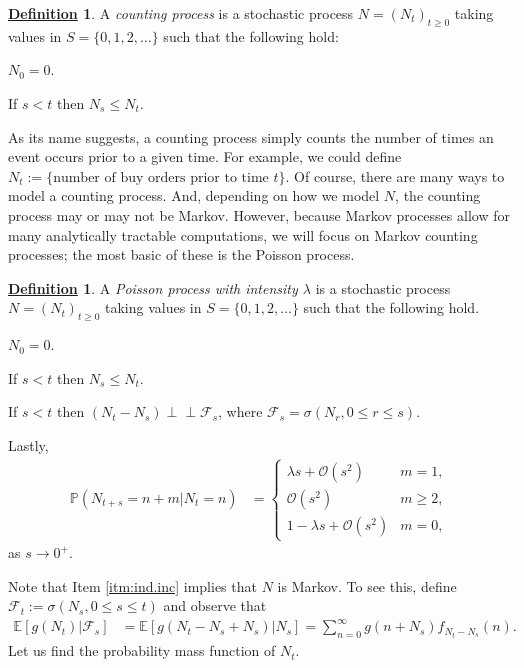 \documentclass[12pt]{book}
\numberwithin{equation}{chapter}
\theoremstyle{plain}
\numberwithin{theorem}{section}
\theoremstyle{definition}
\newtheorem{definition}[theorem]{\underline{Definition}}
\numberwithin{exercise}{chapter}
\newcommand{\<}{\langle}
\renewcommand{\>}{\rangle}
\renewcommand{\(}{\left(}
\renewcommand{\)}{\right)}
\renewcommand{\[}{\left[}
\renewcommand{\]}{\right]}
\newcommand\Eb{\mathds{E}}
\newcommand\Pb{\mathds{P}}
\newcommand\Fc{\mathscr{F}}
\newcommand\Oc{\mathscr{O}}
\newcommand\sig{\sigma}
\newcommand\lam{\lambda}
\newcommand{\ind}{\perp \! \! \! \perp}
\begin{document}
\begin{definition}
A \emph{counting process} is a stochastic process $N = (N_t)_{t \geq 0}$ taking values in $S = \{ 0, 1, 2, \ldots \}$ such that the following hold:
\begin{enumerate*}
\item $N_0 = 0$.
\item If $s<t$ then $N_s \leq N_t$.
\end{enumerate*}
\end{definition}

\noindent
As its name suggests, a counting process simply counts the number of times an event occurs prior to a given time.  For example, we could define $N_t := \{ \text{number of buy orders prior to time $t$} \}$.  Of course, there are many ways to model a counting process.  And, depending on how we model $N$, the counting process may or may not be Markov.  However, because Markov processes allow for many analytically tractable computations, we will focus on Markov counting processes; the most basic of these is the Poisson process.

\begin{definition}
\label{def:poisson.process}
A \emph{Poisson process with intensity $\lam$} is a stochastic process $N = (N_t)_{t \geq 0}$ taking values in $S = \{ 0, 1, 2, \ldots \}$ such that the following hold.
\begin{enumerate*}
\item $N_0 = 0$.
\item If $s<t$ then $N_s \leq N_t$.
\item If $s<t$ then $(N_t - N_s) \ind \Fc_s$, where $\Fc_s=\sigma(N_r, 0\leq r\leq s)$. \label{itm:ind.inc}
\item Lastly, 
\begin{align}
\Pb( N_{t+s} = n+m | N_t = n) 
	&=	\left\{ \begin{array}{ll}
			\lam s + \Oc(s^2) & m=1 ,\\
			\Oc(s^2)					& m\geq 2 ,\\
			1-\lam s + \Oc(s^2) & m = 0 ,
			\end{array} \right.
\end{align}
as $s \to 0^+$.
\end{enumerate*}
\end{definition}

\noindent
Note that Item \ref{itm:ind.inc} implies that $N$ is Markov.  To see this, define $\Fc_t := \sig(N_s, 0 \leq s \leq t)$ and observe that
\begin{align}
\Eb[ g(N_t) | \Fc_s ]
	&=	\Eb[ g(N_t - N_s + N_s) | N_s ]
	=		\sum_{n=0}^\infty g( n + N_s) f_{N_t-N_s}(n) .
\end{align}
Let us find the probability mass function of $N_t$.
\end{document}
